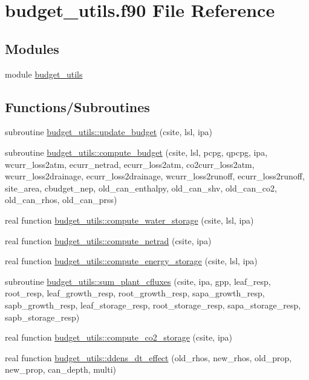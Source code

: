 \hypertarget{budget__utils_8f90}{}\section{budget\+\_\+utils.\+f90 File Reference}
\label{budget__utils_8f90}
\subsection*{Modules}
\begin{DoxyCompactItemize}
\item 
module \hyperlink{namespacebudget__utils}{budget\+\_\+utils}
\end{DoxyCompactItemize}
\subsection*{Functions/\+Subroutines}
\begin{DoxyCompactItemize}
\item 
subroutine \hyperlink{namespacebudget__utils_ac092645bc3b3bd0dcfa2cdedc2451c58}{budget\+\_\+utils\+::update\+\_\+budget} (csite, lsl, ipa)
\item 
subroutine \hyperlink{namespacebudget__utils_a07d8e19ed53707603c43556eb24b5fea}{budget\+\_\+utils\+::compute\+\_\+budget} (csite, lsl, pcpg, qpcpg, ipa, wcurr\+\_\+loss2atm, ecurr\+\_\+netrad, ecurr\+\_\+loss2atm, co2curr\+\_\+loss2atm, wcurr\+\_\+loss2drainage, ecurr\+\_\+loss2drainage, wcurr\+\_\+loss2runoff, ecurr\+\_\+loss2runoff, site\+\_\+area, cbudget\+\_\+nep, old\+\_\+can\+\_\+enthalpy, old\+\_\+can\+\_\+shv, old\+\_\+can\+\_\+co2, old\+\_\+can\+\_\+rhos, old\+\_\+can\+\_\+prss)
\item 
real function \hyperlink{namespacebudget__utils_ad0c764047c557100b3a3cdcd836103a0}{budget\+\_\+utils\+::compute\+\_\+water\+\_\+storage} (csite, lsl, ipa)
\item 
real function \hyperlink{namespacebudget__utils_a6111a1c211ecef562368c8635f64af45}{budget\+\_\+utils\+::compute\+\_\+netrad} (csite, ipa)
\item 
real function \hyperlink{namespacebudget__utils_a319c5f7252c344bcebbd162593e25ec8}{budget\+\_\+utils\+::compute\+\_\+energy\+\_\+storage} (csite, lsl, ipa)
\item 
subroutine \hyperlink{namespacebudget__utils_ae3ca69dd43d1f92a0a86e21fcd57c641}{budget\+\_\+utils\+::sum\+\_\+plant\+\_\+cfluxes} (csite, ipa, gpp, leaf\+\_\+resp, root\+\_\+resp, leaf\+\_\+growth\+\_\+resp, root\+\_\+growth\+\_\+resp, sapa\+\_\+growth\+\_\+resp, sapb\+\_\+growth\+\_\+resp, leaf\+\_\+storage\+\_\+resp, root\+\_\+storage\+\_\+resp, sapa\+\_\+storage\+\_\+resp, sapb\+\_\+storage\+\_\+resp)
\item 
real function \hyperlink{namespacebudget__utils_aa1c4f8466010b1673f2914f1bfe9b6ee}{budget\+\_\+utils\+::compute\+\_\+co2\+\_\+storage} (csite, ipa)
\item 
real function \hyperlink{namespacebudget__utils_ae7ad8d90c28490b0b1c920e7a2656345}{budget\+\_\+utils\+::ddens\+\_\+dt\+\_\+effect} (old\+\_\+rhos, new\+\_\+rhos, old\+\_\+prop, new\+\_\+prop, can\+\_\+depth, multi)
\end{DoxyCompactItemize}
